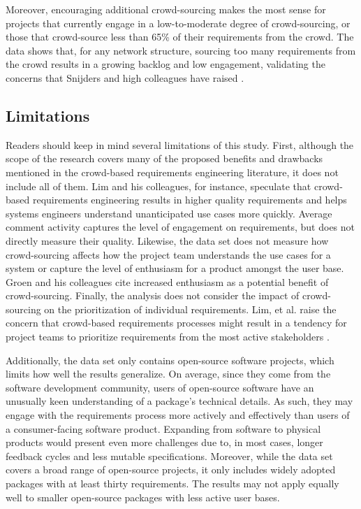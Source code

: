 Moreover, encouraging additional crowd-sourcing makes the most sense for projects that currently engage in a low-to-moderate degree of crowd-sourcing, or those that crowd-source less than 65\% of their requirements from the crowd. The data shows that, for any network structure, sourcing too many requirements from the crowd results in a growing backlog and low engagement, validating the concerns that Snijders and high colleagues have raised \cite{snijders}. 

\subsection{Limitations}
\label{limitations}

Readers should keep in mind several limitations of this study. First, although the scope of the research covers many of the proposed benefits and drawbacks mentioned in the crowd-based requirements engineering literature, it does not include all of them. Lim and his colleagues, for instance, speculate that crowd-based requirements engineering results in higher quality requirements \cite{stakerare} and helps systems engineers understand unanticipated use cases more quickly. Average comment activity captures the level of engagement on requirements, but does not directly measure their quality. Likewise, the data set does not measure how crowd-sourcing affects how the project team understands the use cases for a system or capture the level of enthusiasm for a product amongst the user base. Groen and his colleagues \cite{groen} cite increased enthusiasm as a potential benefit of crowd-sourcing. Finally, the analysis does not consider the impact of crowd-sourcing on the prioritization of individual requirements. Lim, et al. raise the concern that crowd-based requirements processes might result in a tendency for project teams to prioritize requirements from the most active stakeholders \cite{stakenet}. 

Additionally, the data set only contains open-source software projects, which limits how well the results generalize. On average, since they come from the software development community, users of open-source software have an unusually keen understanding of a package's technical details. As such, they may engage with the requirements process more actively and effectively than users of a consumer-facing software product. Expanding from software to physical products would present even more challenges due to, in most cases, longer feedback cycles and less mutable specifications. Moreover, while the data set covers a broad range of open-source projects, it only includes widely adopted packages with at least thirty requirements. The results may not apply equally well to smaller open-source packages with less active user bases.

